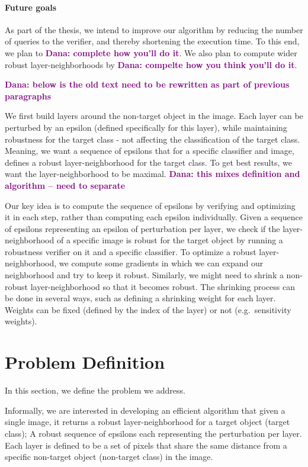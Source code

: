 \documentclass[11pt]{article}
\newcommand{\Dana}[1]{\textcolor{purple}{\bf Dana: #1}}
\begin{document}
\paragraph{Future goals}
As part of the thesis, we intend to improve our algorithm by reducing the number of queries to the verifier, and thereby shortening the execution time. To this end, we plan to \Dana{complete how you'll do it}.
We also plan to compute wider robust layer-neighborhoods by \Dana{compelte how you think you'll do it}.

\Dana{below is the old text need to be rewritten as part of previous paragraphs}

We first build layers around the non-target object in the image.
Each layer can be perturbed by an epsilon (defined specifically for this layer), while maintaining robustness for the target class - not affecting the classification of the target class.
Meaning, we want a sequence of epsilons that for a specific classifier and image, defines a robust layer-neighborhood for the target class.
To get best results, we want the layer-neighborhood to be maximal.
\Dana{this mixes definition and algorithm -- need to separate}

Our key idea is to compute the sequence of epsilons by verifying and optimizing it in each step, rather than computing each epsilon individually.
Given a sequence of epsilons representing an epsilon of perturbation per layer, we check if the layer-neighborhood of a specific image is robust for the target object by running a robustness verifier on it and a specific classifier.
To optimize a robust layer-neighborhood, we compute some gradients in which we can expand our neighborhood and try to keep it robust.
Similarly, we might need to shrink a non-robust layer-neighborhood so that it becomes robust.
The shrinking process can be done in several ways, such as defining a shrinking weight for each layer.
Weights can be fixed (defined by the index of the layer) or not (e.g.\ sensitivity weights).
 

\section{Problem Definition}
In this section, we define the problem we address.

Informally, we are interested in developing an efficient algorithm that given a single image, it returns a robust layer-neighborhood for a target object (target class);
A robust sequence of epsilons each representing the perturbation per layer.
Each layer is defined to be a set of pixels that share the same distance from a specific non-target object (non-target class) in the image.
\end{document}
